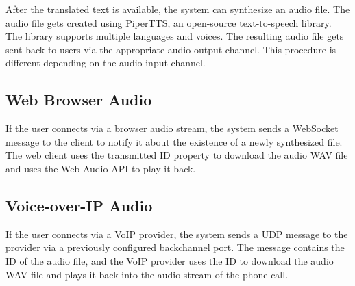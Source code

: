 After the translated text is available, the system can synthesize an audio file. The audio file gets created 
using PiperTTS, an open-source text-to-speech library. The library supports multiple languages and voices. The 
resulting audio file gets sent back to users via the appropriate audio output channel. This procedure is different 
depending on the audio input channel.

\subsection{Web Browser Audio}

If the user connects via a browser audio stream, the system sends a WebSocket message to the client to notify it about 
the existence of a newly synthesized file. The web client uses the transmitted ID property to download the audio WAV 
file and uses the Web Audio API to play it back.

\subsection{Voice-over-IP Audio}
If the user connects via a VoIP provider, the system sends a UDP message to the provider via a previously configured 
backchannel port. The message contains the ID of the audio file, and the VoIP provider uses the ID to download the 
audio WAV file and plays it back into the audio stream of the phone call.

